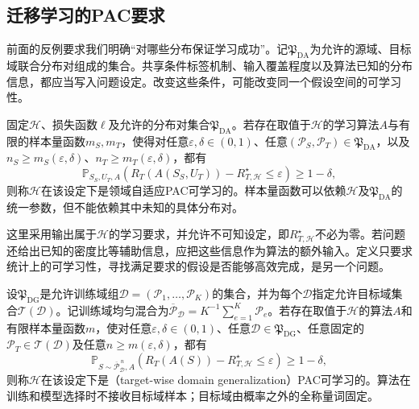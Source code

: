 \subsection{迁移学习的PAC要求}
\label{sec:transfer-pac-setting}

前面的反例要求我们明确“对哪些分布保证学习成功”。记$\mathfrak P_{\mathrm{DA}}$为允许的源域、目标域联合分布对组成的集合。共享条件标签机制、输入覆盖程度以及算法已知的分布信息，都应当写入问题设定。改变这些条件，可能改变同一个假设空间的可学习性。

\begin{definition}[相对于分布族的领域自适应PAC可学习性]
\label{def:adaptation-pac-learnability}
固定$\mathcal H$、损失函数$\ell$及允许的分布对集合$\mathfrak P_{\mathrm{DA}}$。若存在取值于$\mathcal H$的学习算法$A$与有限的样本量函数$m_S,m_T$，使得对任意$\varepsilon,\delta\in(0,1)$、任意$(\mathcal P_S,\mathcal P_T)\in\mathfrak P_{\mathrm{DA}}$，以及$n_S\geq m_S(\varepsilon,\delta)$、$n_T\geq m_T(\varepsilon,\delta)$，都有
\[
 \mathbb P_{S_S,U_T,A}\!\left(
 R_T(A(S_S,U_T))-R_{T,\mathcal H}^{\star}\leq\varepsilon
 \right)\geq1-\delta,
\]
则称$\mathcal H$在该设定下是领域自适应PAC可学习的。样本量函数可以依赖$\mathcal H$及$\mathfrak P_{\mathrm{DA}}$的统一参数，但不能依赖其中未知的具体分布对。
\end{definition}

这里采用输出属于$\mathcal H$的学习要求，并允许不可知设定，即$R_{T,\mathcal H}^{\star}$不必为零。若问题还给出已知的密度比等辅助信息，应把这些信息作为算法的额外输入。定义只要求统计上的可学习性，寻找满足要求的假设是否能够高效完成，是另一个问题。

\begin{definition}[逐目标域领域泛化PAC可学习性]
\label{def:targetwise-domain-generalization-pac}
设$\mathfrak P_{\mathrm{DG}}$是允许训练域组$\mathcal D=(\mathcal P_1,\ldots,\mathcal P_K)$的集合，并为每个$\mathcal D$指定允许目标域集合$\mathcal T(\mathcal D)$。记训练域均匀混合为$\overline{\mathcal P}_{\mathcal D}=K^{-1}\sum_{e=1}^K\mathcal P_e$。若存在取值于$\mathcal H$的算法$A$和有限样本量函数$m$，使对任意$\varepsilon,\delta\in(0,1)$、任意$\mathcal D\in\mathfrak P_{\mathrm{DG}}$、任意固定的$\mathcal P_T\in\mathcal T(\mathcal D)$及任意$n\geq m(\varepsilon,\delta)$，都有
\[
 \mathbb P_{S\sim\overline{\mathcal P}_{\mathcal D}^{\,n},A}\!\left(
 R_T(A(S))-R_{T,\mathcal H}^{\star}\leq\varepsilon
 \right)\geq1-\delta,
\]
则称$\mathcal H$在该设定下是（target-wise domain generalization）PAC可学习的。算法在训练和模型选择时不接收目标域样本；目标域由概率之外的全称量词固定。
\end{definition}


